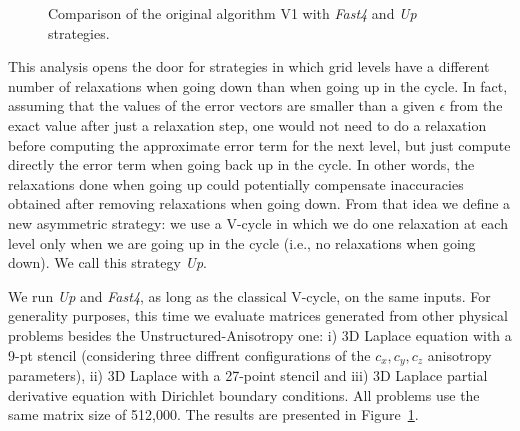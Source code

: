 \begin{figure}
    \caption{Comparison of the original algorithm V1 with \emph{Fast4} and \emph{Up} strategies.}
    \label{fig.up_comparison}
\end{figure}

This analysis opens the door for strategies in which grid levels have a
different number of relaxations when going down than when going up in the
cycle.  In fact, assuming that the values of the error vectors are smaller
than a given $\epsilon$ from the exact value after just a relaxation step, one
would not need to do a relaxation before computing the approximate error term
for the next level, but just compute directly the error term when going back up
in the cycle. In other words, the relaxations done when going up could
potentially compensate inaccuracies obtained after removing relaxations when
going down. From that idea we define a new asymmetric strategy: we use a
V-cycle in which we do one relaxation at each level only when we are going up
in the cycle (i.e., no relaxations when going down).  We call this strategy
\emph{Up}.

We run \emph{Up} and \emph{Fast4}, as long as the classical V-cycle, on the
same inputs. For generality purposes, this time we
evaluate matrices generated from other physical problems besides the Unstructured-Anisotropy one: i) 3D Laplace equation with a 9-pt stencil (considering three diffrent configurations of the $c_x,c_y,c_z$ anisotropy parameters), ii) 3D Laplace
with a 27-point stencil and iii) 3D Laplace partial derivative equation with
Dirichlet boundary conditions. All problems use the same matrix size of 512,000. The
results are presented in Figure~\ref{fig.up_comparison}.


